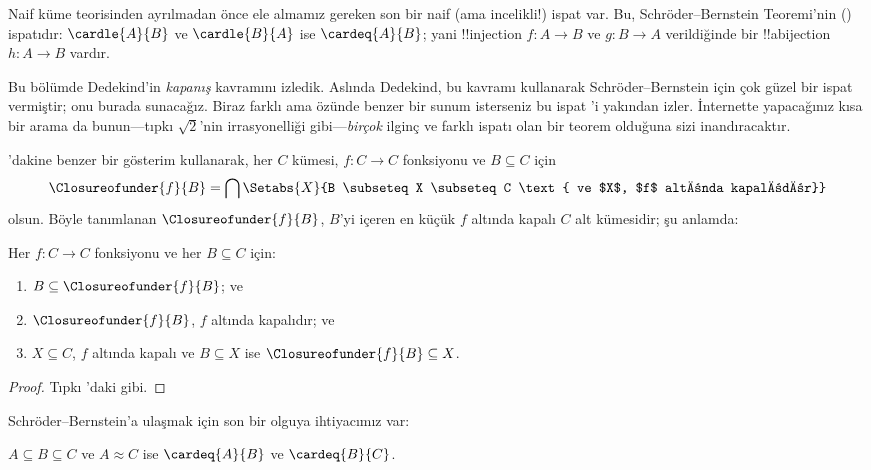 \documentclass[../../../include/open-logic-section]{subfiles}
\begin{document}


Naif küme teorisinden ayrılmadan önce ele almamız gereken son bir naif (ama
incelikli!) ispat var. Bu, Schr\"oder--Bernstein Teoremi'nin
() ispatıdır:
$\cardle{A}{B}$ ve $\cardle{B}{A}$ ise $\cardeq{A}{B}$; yani
!!{injection} $f\colon A\to B$ ve $g\colon B\to A$ verildiğinde bir
!!a{bijection} $h\colon A\to B$ vardır.

Bu bölümde Dedekind'in \emph{kapanış} kavramını izledik. Aslında Dedekind,
bu kavramı kullanarak Schr\"oder--Bernstein için çok güzel bir ispat
vermiştir; onu burada sunacağız. Biraz farklı ama özünde benzer bir sunum
isterseniz bu ispat \citet[pp.~157--8]{Potter2004}'i yakından izler. İnternette
yapacağınız kısa bir arama da bunun---tıpkı $\sqrt{2}$'nin irrasyonelliği
gibi---\emph{birçok} ilginç ve farklı ispatı olan bir teorem olduğuna sizi
inandıracaktır.

'dakine benzer bir gösterim
kullanarak, her $C$ kümesi, $f\colon C\to C$ fonksiyonu ve $B\subseteq C$
için
\[
\Closureofunder{f}{B} = \bigcap \Setabs{X}{B \subseteq X \subseteq C
\text{ ve $X$, $f$ altında kapalıdır}}
\]
olsun. Böyle tanımlanan $\Closureofunder{f}{B}$, $B$'yi içeren en küçük
$f$ altında kapalı $C$ alt kümesidir; şu anlamda:

\begin{lem}
	Her $f\colon C\to C$ fonksiyonu ve her $B\subseteq C$ için:
	\begin{enumerate}
		\item{} $B \subseteq \Closureofunder{f}{B}$; ve
		\item{} $\Closureofunder{f}{B}$, $f$ altında
		kapalıdır; ve
		\item{} $X\subseteq C$, $f$ altında kapalı ve
		$B\subseteq X$ ise $\Closureofunder{f}{B}\subseteq X$.
	\end{enumerate}
\end{lem}

\begin{proof}
Tıpkı 'daki gibi.
\end{proof}

Schr\"oder--Bernstein'a ulaşmak için son bir olguya ihtiyacımız var:

\begin{prop}
$A\subseteq B\subseteq C$ ve $A\approx C$ ise $\cardeq{A}{B}$ ve
$\cardeq{B}{C}$.
\end{prop}
\end{document}
